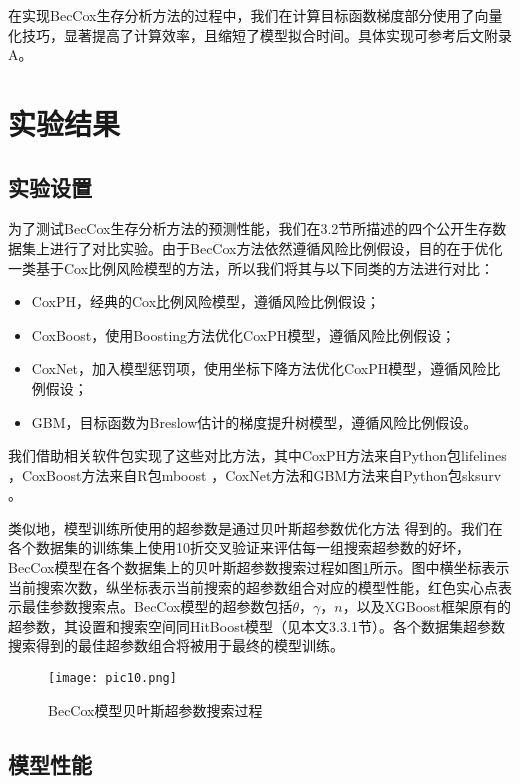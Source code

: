 在实现BecCox生存分析方法的过程中，我们在计算目标函数梯度部分使用了向量化技巧，显著提高了计算效率，且缩短了模型拟合时间。具体实现可参考后文附录A。

\section{实验结果}

\subsection{实验设置}

为了测试BecCox生存分析方法的预测性能，我们在3.2节所描述的四个公开生存数据集上进行了对比实验。由于BecCox方法依然遵循风险比例假设，目的在于优化一类基于Cox比例风险模型的方法，所以我们将其与以下同类的方法进行对比：
\begin{itemize}
  \item CoxPH，经典的Cox比例风险模型，遵循风险比例假设；
  \item CoxBoost，使用Boosting方法优化CoxPH模型，遵循风险比例假设；
  \item CoxNet，加入模型惩罚项，使用坐标下降方法优化CoxPH模型，遵循风险比例假设；
  \item GBM，目标函数为Breslow估计的梯度提升树模型，遵循风险比例假设。
\end{itemize}
我们借助相关软件包实现了这些对比方法，其中CoxPH方法来自Python包lifelines ，CoxBoost方法来自R包mboost ，CoxNet方法和GBM方法来自Python包sksurv 。

类似地，模型训练所使用的超参数是通过贝叶斯超参数优化方法 得到的。我们在各个数据集的训练集上使用10折交叉验证来评估每一组搜索超参数的好坏，BecCox模型在各个数据集上的贝叶斯超参数搜索过程如图\ref{pic10}所示。图中横坐标表示当前搜索次数，纵坐标表示当前搜索的超参数组合对应的模型性能，红色实心点表示最佳参数搜索点。BecCox模型的超参数包括$\theta$，$\gamma$，$n$，以及XGBoost框架原有的超参数，其设置和搜索空间同HitBoost模型（见本文3.3.1节）。各个数据集超参数搜索得到的最佳超参数组合将被用于最终的模型训练。

\begin{figure}[H]
\texttt{[image: pic10.png]}
\caption{BecCox模型贝叶斯超参数搜索过程}
\label{pic10}
\end{figure}

\subsection{模型性能}

